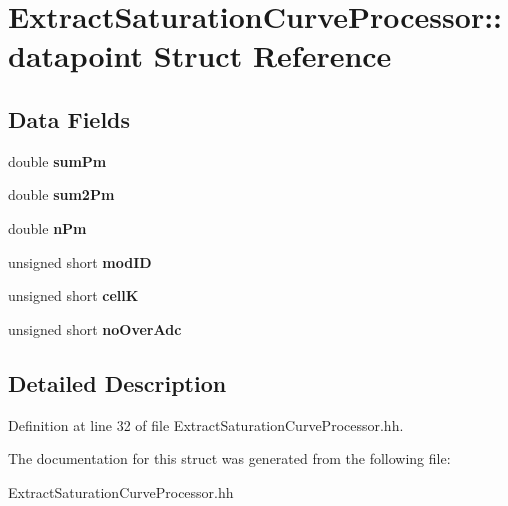 \section{Extract\-Saturation\-Curve\-Processor\-:\-:datapoint Struct Reference}
\label{structExtractSaturationCurveProcessor_1_1datapoint}
\subsection*{Data Fields}
\begin{DoxyCompactItemize}
\item 
double {\bfseries sum\-Pm}\label{structExtractSaturationCurveProcessor_1_1datapoint_a95a66cd8dc11004ee0d5bec531b6f9a3}

\item 
double {\bfseries sum2\-Pm}\label{structExtractSaturationCurveProcessor_1_1datapoint_a175a8abce00fbf18204150113b5f1dd2}

\item 
double {\bfseries n\-Pm}\label{structExtractSaturationCurveProcessor_1_1datapoint_ad6da2b245ba9533d32814a282043b131}

\item 
unsigned short {\bfseries mod\-I\-D}\label{structExtractSaturationCurveProcessor_1_1datapoint_ad82b7c88318e0150ddd4c5ef5b0246aa}

\item 
unsigned short {\bfseries cell\-K}\label{structExtractSaturationCurveProcessor_1_1datapoint_a00e2b475749c963975f90148f7e31112}

\item 
unsigned short {\bfseries no\-Over\-Adc}\label{structExtractSaturationCurveProcessor_1_1datapoint_ae299248e5420388f5c3cd72a8ca71d39}

\end{DoxyCompactItemize}


\subsection{Detailed Description}


Definition at line 32 of file Extract\-Saturation\-Curve\-Processor.\-hh.



The documentation for this struct was generated from the following file\-:\begin{DoxyCompactItemize}
\item 
Extract\-Saturation\-Curve\-Processor.\-hh\end{DoxyCompactItemize}
